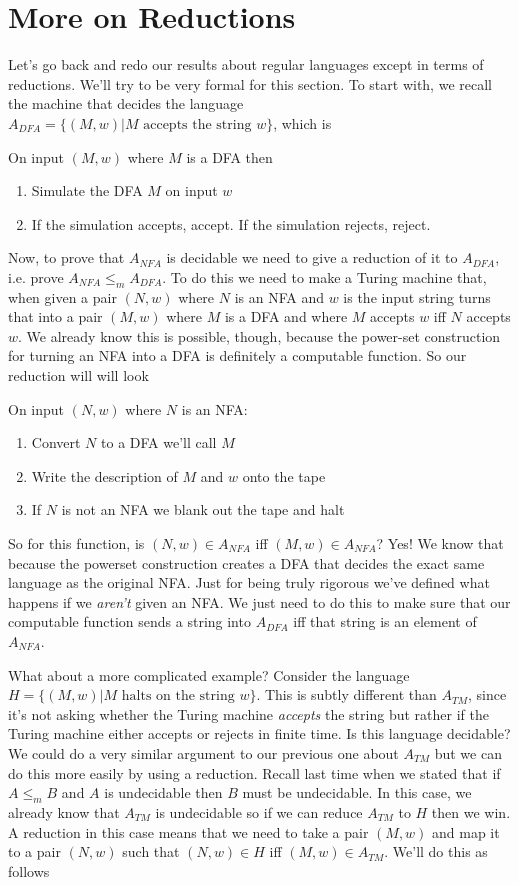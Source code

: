 \documentclass[11pt]{article}
\begin{document}
\section{More on Reductions}
\label{sec-15}
Let's go back and redo our results about regular languages except in terms of reductions. We'll try to be very formal for this section. To start with, we recall the machine that decides the language $A_{DFA} = \{(M,w) | M \text{ accepts the string } w\}$, which is 

On input $(M,w)$ where $M$ is a DFA then 
\begin{enumerate}
\item Simulate the DFA $M$ on input $w$
\item If the simulation accepts, accept. If the simulation rejects, reject.
\end{enumerate}

Now, to prove that $A_{NFA}$ is decidable we need to give a reduction of it to $A_{DFA}$, i.e. prove $A_{NFA} \le_m A_{DFA}$. To do this we need to make a Turing machine that, when given a pair $(N,w)$ where $N$ is an NFA and $w$ is the input string turns that into a pair $(M,w)$ where $M$ is a DFA and where $M$ accepts $w$ iff $N$ accepts $w$. We already know this is possible, though, because the power-set construction for turning an NFA into a DFA is definitely a computable function. So our reduction will will look 

On input $(N,w)$ where $N$ is an NFA:
\begin{enumerate}
\item Convert $N$ to a DFA we'll call $M$
\item Write the description of $M$ and $w$ onto the tape
\item If $N$ is not an NFA we blank out the tape and halt
\end{enumerate}

So for this function, is $(N,w) \in A_{NFA}$ iff $(M,w) \in A_{NFA}$? Yes! We know that because the powerset construction creates a DFA that decides the exact same language as the original NFA. Just for being truly rigorous we've defined what happens if we \emph{aren't} given an NFA. We just need to do this to make sure that our computable function sends a string into $A_{DFA}$ iff that string is an element of $A_{NFA}$.

What about a more complicated example? Consider the language $H = \{(M,w) | M \text{ halts on the string } w\}$. This is subtly different than $A_{TM}$, since it's not asking whether the Turing machine \emph{accepts} the string but rather if the Turing machine either accepts or rejects in finite time. Is this language decidable? We could do a very similar argument to our previous one about $A_{TM}$ but we can do this more easily by using a reduction. Recall last time when we stated that if $A \le_m B$ and $A$ is undecidable then $B$ must be undecidable. In this case, we already know that $A_{TM}$ is undecidable so if we can reduce $A_{TM}$ to $H$ then we win. A reduction in this case means that we need to take a pair $(M,w)$ and map it to a pair $(N,w)$ such that $(N,w) \in H$ iff $(M,w) \in A_{TM}$. We'll do this as follows
\end{document}
